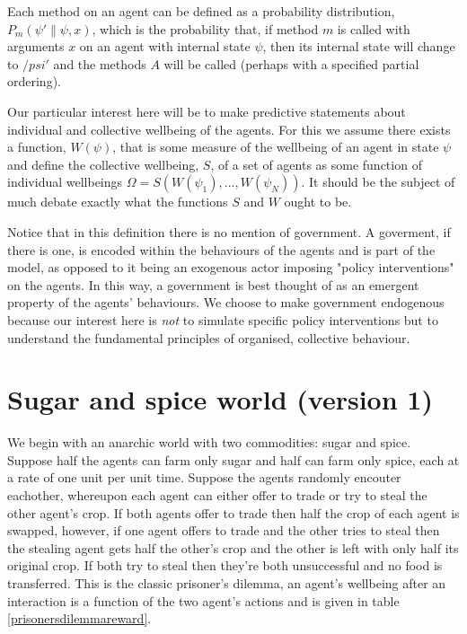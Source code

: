 \documentclass[a4paper]{report}
\begin{document}
Each method on an agent can be defined as a probability distribution, $P_m(\psi'\|\psi,x)$, which is the probability that, if method $m$ is called with arguments $x$ on an agent with internal state $\psi$, then its internal state will change to $/psi'$ and the methods $A$ will be called (perhaps with a specified partial ordering). 

Our particular interest here will be to make predictive statements about individual and collective wellbeing of the agents. For this we assume there exists a function, $W(\psi)$, that is some measure of the wellbeing of an agent in state $\psi$ and define the collective wellbeing, $S$,  of a set of agents as some function of individual wellbeings $\Omega = S( W(\psi_1), ..., W(\psi_N))$. It should be the subject of much debate exactly what the functions $S$ and $W$ ought to be.

Notice that in this definition there is no mention of government. A goverment, if there is one, is encoded within the behaviours of the agents and is part of the model, as opposed to it being an exogenous actor imposing "policy interventions" on the agents. In this way, a government is best thought of as an emergent property of the agents' behaviours. We choose to make government endogenous because our interest here is \textit{not} to simulate specific policy interventions but to understand the fundamental principles of organised, collective behaviour.

\chapter{Sugar and spice world (version 1)}

We begin with an anarchic world with two commodities: sugar and spice. Suppose half the agents can farm only sugar and half can farm only spice, each at a rate of one unit per unit time. Suppose the agents randomly encouter eachother, whereupon each agent can either offer to trade or try to steal the other agent's crop. If both agents offer to trade then half the crop of each agent is swapped, however, if one agent offers to trade and the other tries to steal then the stealing agent gets half the other's crop and the other is left with only half its original crop. If both try to steal then they're both unsuccessful and no food is transferred. This is the classic prisoner's dilemma, an agent's wellbeing after an interaction is a function of the two agent's actions and is given in table \ref{prisonersdilemmareward}.
\end{document}
